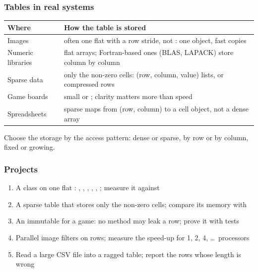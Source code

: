 \documentclass[aspectratio=169,10pt,compress]{beamer}
\begin{document}
\begin{frame}[t,fragile] \frametitle{Tables in real systems}


\begin{table}
		\small
		\begin{tabular}{@{}L{0.24\textwidth}L{0.68\textwidth}@{}}
			\toprule
			\textbf{Where} & \textbf{How the table is stored} \\
			\midrule
			Images            & often one flat  with a row stride, not : one object, fast copies \\
			Numeric libraries & flat arrays; Fortran-based ones (BLAS, LAPACK) store column by column \\
			Sparse data       & only the non-zero cells: (row, column, value) lists, or compressed rows \\
			Game boards       & small  or ; clarity matters more than speed \\
			Spreadsheets      & sparse maps from (row, column) to a cell object, not a dense array \\
			\bottomrule
		\end{tabular}
\end{table}%


	\vspace{0.3em}
	\small Choose the storage by the access pattern: dense or sparse, by row or by column, fixed or growing.
\end{frame}








\begin{frame}[t,fragile] \frametitle{Projects}
	\begin{enumerate}\small
		\item A  class on one flat : , , , ,
			  , ; measure it against 
		\item A sparse table that stores only the non-zero cells; compare its memory with 
		\item An immutable  for a game: no method may leak a row; prove it with tests
		\item Parallel image filters on rows; measure the speed-up for 1, 2, 4, \dots\ processors
		\item Read a large CSV file into a ragged table; report the rows whose length is wrong
	\end{enumerate}
\end{frame}
\end{document}
